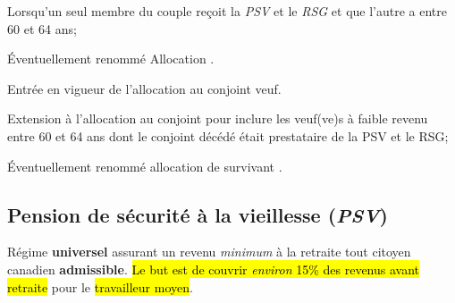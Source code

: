 \documentclass[10pt, french]{article}
\begin{document}
\begin{multicols*}{3}
\begin{rappel_enhanced}[Historique]
\begin{description}
		\begin{itemize}[leftmargin = *]
		\item	{\color{burntorange} Lorsqu'un seul membre du couple reçoit la \textit{PSV} et le \textit{RSG} et que l'autre a entre 60 et 64 ans;
		\item	Éventuellement renommé \og Allocation \fg{}.}
		\end{itemize}
	\item[1985]	Entrée en vigueur de l'allocation au conjoint veuf.
		\begin{itemize}[leftmargin = *]
		\item	{\color{burntorange} Extension à l'allocation au conjoint pour inclure les veuf(ve)s à faible revenu entre 60 et 64 ans dont le conjoint décédé était prestataire de la PSV et le RSG;
		\item	Éventuellement renommé \og allocation de survivant \fg{}.}
		\end{itemize}
\end{description}
\end{rappel_enhanced}

\subsection{Pension de sécurité à la vieillesse (\textit{PSV})}
\label{sec:PSV}
\begin{definitionNOHFILL}[Définition]
Régime \textbf{universel} assurant un revenu \textit{minimum} à la retraite tout citoyen canadien \textbf{admissible}. 
\hl{Le but est de couvrir \textit{environ} 15\% des revenus avant retraite} pour le \hl{travailleur moyen}.
\end{definitionNOHFILL}


\end{multicols*}
\end{document}

